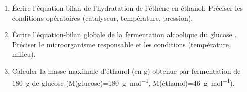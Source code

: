 \documentclass[11pt]{article}
\begin{document}
\begin{exercice}
\begin{enumerate}
    \item Écrire l'équation-bilan de l'hydratation de l'éthène  en éthanol. Préciser les conditions opératoires (catalyseur, température, pression).
    \item Écrire l'équation-bilan globale de la fermentation alcoolique du glucose . Préciser le microorganisme responsable et les conditions (température, milieu).
    \item Calculer la masse maximale d'éthanol (en g) obtenue par fermentation de \SI{180}{g} de glucose (M(glucose)=\SI{180}{g.mol^{-1}}, M(éthanol)=\SI{46}{g.mol^{-1}}).
\end{enumerate}
\end{exercice}
\end{document}

